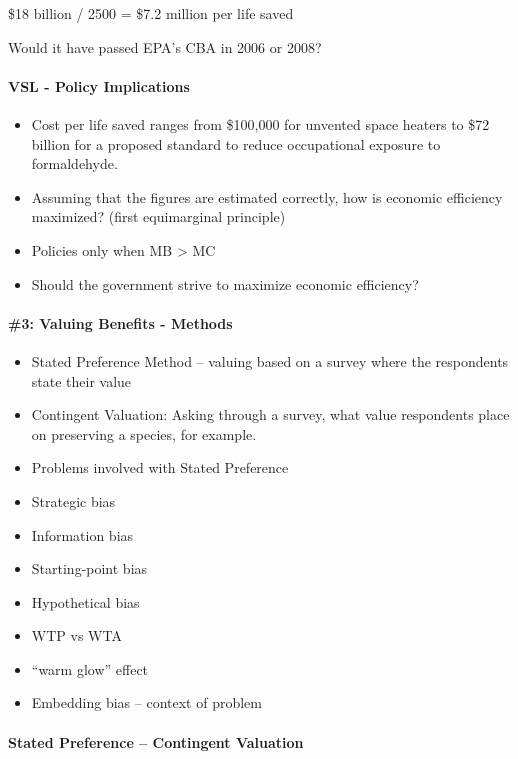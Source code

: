 \documentclass[]{article}
\let\oldparagraph\paragraph
\renewcommand{\paragraph}[1]{\oldparagraph{#1}\mbox{}}
\begin{document}
\$18 billion / 2500 = \$7.2 million per life saved

Would it have passed EPA's CBA in 2006 or 2008?

\hypertarget{vsl---policy-implications}{%
\paragraph{VSL - Policy Implications}\label{vsl---policy-implications}}

\begin{itemize}
\item
  Cost per life saved ranges from \$100,000 for unvented space heaters
  to \$72 billion for a proposed standard to reduce occupational
  exposure to formaldehyde.
\item
  Assuming that the figures are estimated correctly, how is economic
  efficiency maximized? (first equimarginal principle)
\item
  Policies only when MB \textgreater{} MC
\item
  Should the government strive to maximize economic efficiency?
\end{itemize}

\hypertarget{valuing-benefits---methods-1}{%
\paragraph{\#3: Valuing Benefits -
Methods}\label{valuing-benefits---methods-1}}

\begin{itemize}
\item
  Stated Preference Method -- valuing based on a survey where the
  respondents state their value
\item
  Contingent Valuation: Asking through a survey, what value respondents
  place on preserving a species, for example.
\item
  Problems involved with Stated Preference
\item
  Strategic bias
\item
  Information bias
\item
  Starting-point bias
\item
  Hypothetical bias
\item
  WTP vs WTA
\item
  ``warm glow'' effect
\item
  Embedding bias -- context of problem
\end{itemize}

\hypertarget{stated-preference-contingent-valuation}{%
\paragraph{Stated Preference -- Contingent
Valuation}\label{stated-preference-contingent-valuation}}
\end{document}
